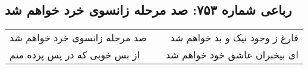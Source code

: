 \begin{center}
\section*{رباعی شماره ۷۵۳: صد مرحله زانسوی خرد خواهم شد}
\label{sec:0753}
\begin{longtable}{l p{0.5cm} r}
صد مرحله زانسوی خرد خواهم شد
&&
فارغ ز وجود نیک و بد خواهم شد
\\
از بس خوبی که در پس پرده منم
&&
ای بیخبران عاشق خود خواهم شد
\\
\end{longtable}
\end{center}
